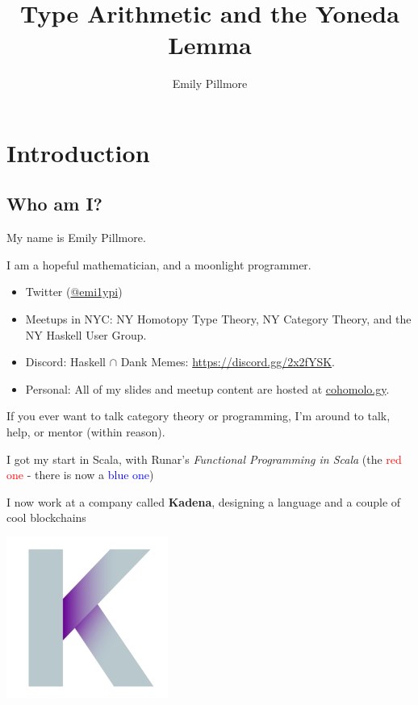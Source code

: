 \documentclass[tikz]{beamer}
\title{Type Arithmetic and the Yoneda Lemma}
\author{Emily Pillmore}
\theoremstyle{definition}
\begin{document}
\frame{\titlepage}

\section[Outline]{}
\frame{\tableofcontents[hideallsubsections]}

\section{Introduction}
\subsection{Who am I?}

\frame
{
	My name is Emily Pillmore.
	
	I am a hopeful mathematician, and a moonlight programmer.
}

\frame
{
	\begin{itemize}
		\item Twitter (\href{https://twitter.com/emi1ypi}{@emi1ypi})
		\item Meetups in NYC: NY Homotopy Type Theory, NY Category Theory, and the NY Haskell User Group. 
		\item Discord: Haskell $\cap$ Dank Memes: \href{https://discord.gg/2x2fYSK}{https://discord.gg/2x2fYSK}. 
		\item Personal: All of my slides and meetup content are hosted at \href{https://github.com/cohomolo-gy}{cohomolo.gy}.
	\end{itemize}
	
	
	If you ever want to talk category theory or programming, I'm around to talk, help, or mentor (within reason).
}

\frame
{
	I got my start in Scala, with Runar's \textit{Functional Programming in Scala} (the \textcolor{red}{red one} - there is now a \textcolor{blue}{blue one})
}


\frame
{ 
	I now work at a company called \textbf{Kadena}, designing a language and a couple of cool blockchains
	\begin{center}
	
		\includegraphics[scale=0.3]{kadena}
	\end{center}
	
}
\end{document}
